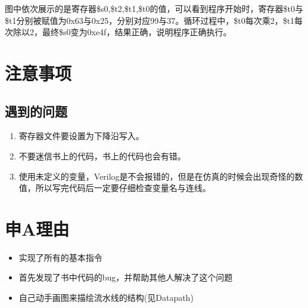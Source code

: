 \documentclass[12pt]{article} %
\begin{document}
\begin{sloppypar}
图中依次展示的是寄存器\$s0,\$t2,\$t1,\$t0的值，可以看到程序开始时，寄存器\$t0与\$t1分别被赋值为0x63与0x25，分别对应99与37。循环过程中，\$t0每次乘2，\$t1每次除以2，最终\$s0变为0xe4f，结果正确，说明程序正确执行。



\section{注意事项}

\subsection{遇到的问题}

\begin{enumerate}
\item 寄存器文件要设置为下降沿写入。
\item 不要迷信书上的代码，书上的代码也会有错。
\item 使用未定义的变量，Verilog是不会报错的，但是在仿真的时候会出现奇怪的数值，所以写完代码后一定要仔细检查变量名与连线。
\end{enumerate}

\section{申A理由}

\begin{itemize}
\item 实现了所有的基本指令
\item 首先发现了书中代码的bug，并帮助其他人解决了这个问题
\item 自己动手画图来描绘流水线的结构(见Datapath)
\end{itemize}

\end{sloppypar}
\end{document}
